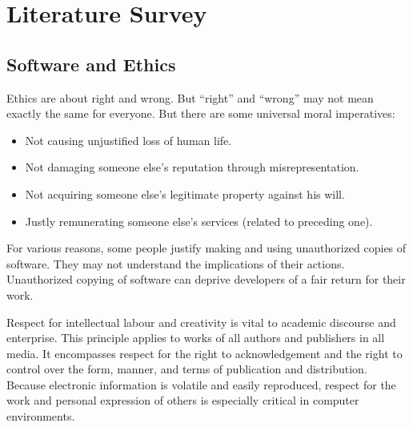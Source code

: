 \chapter{Literature Survey}

\section{Software and Ethics}
Ethics are about right and wrong. But ``right'' and ``wrong'' may not mean exactly the same for everyone. But there are some universal moral imperatives\textsuperscript{\cite{meyer}}:
\begin{itemize}
\item Not causing unjustified loss of human life.
\item Not damaging someone else's reputation through misrepresentation.
\item Not acquiring someone else's legitimate property against his will.
\item Justly remunerating someone else's services (related to preceding one).
\end{itemize}
For various reasons, some people justify making and using unauthorized copies of software. They may not understand the implications of their actions. Unauthorized copying of software can deprive developers of a fair return for their work.

Respect for intellectual labour and creativity is vital to academic discourse and enterprise. This principle applies to works of all authors and publishers in all media. It encompasses respect for the right to acknowledgement and the right to control over the form, manner, and terms of publication and distribution. Because electronic information is volatile and easily reproduced, respect for the work and personal expression of others is especially critical in computer environments.

